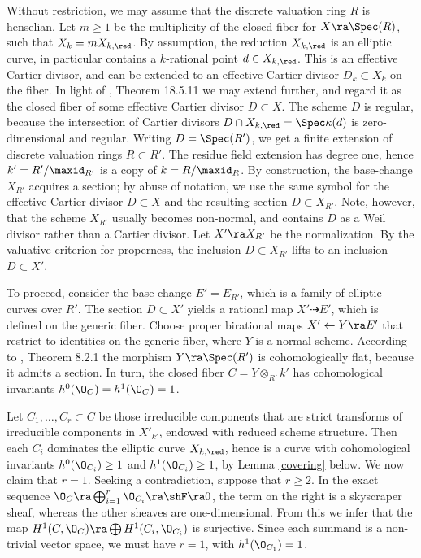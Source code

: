 \proof
Without restriction, we may assume that the discrete valuation ring $R$ is henselian.
Let $m\geq 1$ be the multiplicity of the closed fiber for $X\ra\Spec(R)$, such
that $X_k=mX_{k,\red}$. By assumption, the reduction $X_{k,\red}$ is an elliptic curve,  in particular contains a
$k$-rational point $d\in X_{k,\red}$. This is an effective Cartier divisor,
and can be extended to an effective Cartier divisor $D_k\subset X_k$ on the   fiber.
In light of \cite{EGA-IVd}, Theorem 18.5.11 we may extend further, and regard it as the closed
fiber of some effective Cartier divisor $D\subset X$.
The scheme $D$ is regular, because the intersection of Cartier divisors $D\cap X_{k,\red}=\Spec \kappa(d)$
is  zero-dimensional and regular. Writing $D=\Spec(R')$, we get a finite extension of discrete valuation rings
$R\subset R'$. The residue field extension has degree one, hence $k'=R'/\maxid_{R'}$ is a copy of $k=R/\maxid_R$.
By construction, the base-change $X_{R'}$
acquires a section;  by abuse of notation, we use the same symbol for the
effective Cartier divisor $D\subset X$ and the resulting section $D\subset X_{R'}$.
Note, however, that the scheme $X_{R'}$   usually becomes non-normal, and contains $D$
as a Weil divisor rather than a Cartier divisor.
Let $X'\ra X_{R'}$ be the normalization. By the valuative criterion for properness,
the inclusion $D\subset X_{R'}$ lifts to an inclusion $D\subset X'$.

To proceed, consider the base-change $E'=E_{R'}$, which is a family of elliptic curves over $R'$.
The section $D\subset X'$ yields a  rational map $X'\dashrightarrow E'$, which is
defined on the generic fiber. Choose  proper birational  maps $X'\leftarrow Y\ra E'$
that restrict to identities on the generic fiber,  where $Y$ is a normal scheme.
According to \cite{Raynaud-1970}, Theorem 8.2.1 the morphism $Y\ra\Spec(R')$ is cohomologically flat,
because it admits a section. In turn, the closed fiber $C=Y\otimes_{R'}k'$ has cohomological invariants
$h^0(\O_C)=h^1(\O_{C})=1$.

Let $C_1,\ldots,C_r\subset C$ be those irreducible components
that are strict transforms of irreducible components in $X'_{k'}$, endowed with reduced scheme structure.
Then each $C_i$ dominates the elliptic curve $X_{k,\red}$,
hence is a curve with cohomological invariants $h^0(\O_{C_i})\geq 1$ and  $h^1(\O_{C_i})\geq 1$,
by Lemma \ref{covering} below. We now claim that  $r=1$.
Seeking a contradiction,   suppose that $r\geq 2$. In the   exact sequence
$\O_C\ra \bigoplus_{i=1}^r \O_{C_i}\ra \shF\ra 0$,
the term on the right is a skyscraper sheaf, whereas the other sheaves are one-dimensional.
From this we infer that the map  $H^1(C,\O_C)\ra \bigoplus H^1(C_i,\O_{C_i})$
is surjective. Since each summand is a non-trivial vector space, we must have $r=1$, with $h^1(\O_{C_1})=1$.

